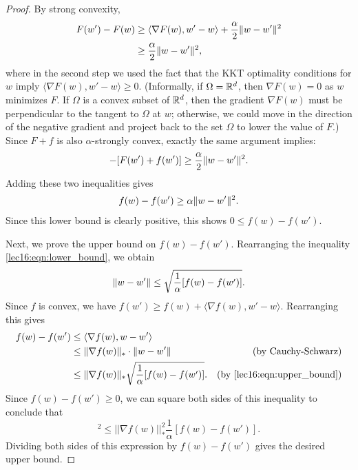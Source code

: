 \begin{proof}
By strong convexity,
\begin{align}
F(w') - F(w) &\geq \langle \nabla F(w), w' - w \rangle + \frac{\alpha}{2} \|w - w'\|^2 \\
&\geq \frac{\alpha}{2} \|w - w'\|^2,
\end{align}
where in the second step we used the fact that the KKT optimality conditions for $w$ imply $\langle \nabla F(w), w' - w \rangle \geq 0$. (Informally, if $\Omega = \mathbb R^d$, then $\nabla F(w) = 0$ as $w$ minimizes $F$. If $\Omega$ is a convex subset of $\mathbb R^d$, then the gradient $\nabla F(w)$ must be perpendicular to the tangent to $\Omega$ at $w$; otherwise, we could move in the direction of the negative gradient and project back to the set $\Omega$ to lower the value of $F$.) Since $F + f$ is also $\alpha$-strongly convex, exactly the same argument implies:
\begin{align}
[F(w) + f(w)] - [F(w') + f(w')] \geq \frac{\alpha}{2} \norm{w - w'}^2.
\end{align}
Adding these two inequalities gives
\begin{align}
f(w) - f(w') \geq \alpha \|w - w'\|^2. \label{lec16:eqn:lower_bound}
\end{align}
Since this lower bound is clearly positive, this shows $0 \leq f(w) - f(w')$.

Next, we prove the upper bound on $f(w) - f(w')$. Rearranging the inequality \eqref{lec16:eqn:lower_bound}, we obtain
\begin{align}
\|w - w'\| \leq \sqrt{\frac{1}{\alpha} [f(w) - f(w')]}. \label{lec16:eqn:upper_bound}
\end{align}
Since $f$ is convex, we have $f(w') \geq f(w) + \langle \nabla f(w), w' - w \rangle$.  Rearranging this gives
\begin{align*}
f(w) - f(w') &\leq \langle \nabla f(w), w - w' \rangle\\
&\leq \|\nabla f(w)\|_* \cdot \|w - w'\| &\text{(by Cauchy-Schwarz)} \\
&\leq \|\nabla f(w)\|_* \sqrt{ \frac{1}{\alpha} [f(w) - f(w')]}. &\text{(by \eqref{lec16:eqn:upper_bound})}
\end{align*}
Since $f(w) - f(w') \geq 0$, we can square both sides of this inequality to conclude that
\begin{equation}
[f(w) - f(w')]^2 \leq || \nabla f(w) ||_*^2 \frac{1}{\alpha} [f(w) - f(w')].
\end{equation}
Dividing both sides of this expression by $f(w) - f(w')$ gives the desired upper bound.
\end{proof}

